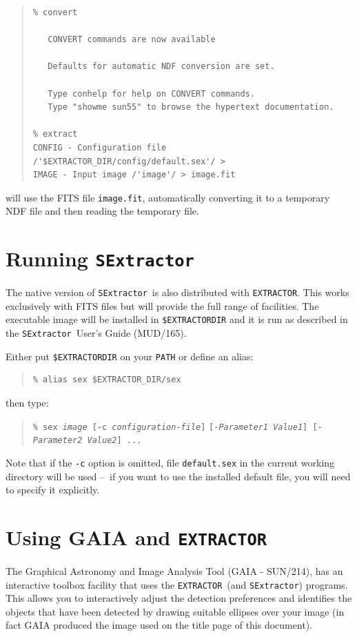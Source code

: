 \documentclass[twoside,11pt]{article}
\newcommand{\htmladdnormallink}[2]{#1}
\newcommand{\latex}[1]{#1}
\newcommand{\xref}[3]{#1}
\newcommand{\xlabel}[1]{}
\renewcommand{\_}{\texttt{\symbol{95}}}
\newcommand{\EXTRACTOR}{\texttt{EXTRACTOR}}
\newcommand{\SExtractor}{\texttt{SExtractor}}
\newcommand{\MUD}{mud165.ps}
\newcommand{\dash}{--}
\newcommand{\dash}{-}
\begin{document}
\begin{quote} \begin{verbatim}
% convert

   CONVERT commands are now available

   Defaults for automatic NDF conversion are set.

   Type conhelp for help on CONVERT commands.
   Type "showme sun55" to browse the hypertext documentation.

% extract
CONFIG - Configuration file /'$EXTRACTOR_DIR/config/default.sex'/ >
IMAGE - Input image /'image'/ > image.fit
\end{verbatim} \end{quote}
will use the FITS file \texttt{image.fit}, automatically converting it to a
temporary NDF file and then reading the temporary file.

\section{\xlabel{running_sextractor}Running \SExtractor \label{running_sextractor}}
The native version of \SExtractor\ is also distributed with \EXTRACTOR.
This works exclusively with FITS files but will provide the full range of
facilities. The executable image will be installed in \texttt{\$EXTRACTOR\_DIR}
and it is run as described in the
\htmladdnormallink{\SExtractor\ User's Guide}{\MUD}\latex{ (MUD/165)}.

Either put \texttt{\$EXTRACTOR\_DIR} on your \texttt{PATH} or define an alias:
\begin{quote} \begin{verbatim}
% alias sex $EXTRACTOR_DIR/sex
\end{verbatim}\end{quote}
then type:
\begin{quote}
\texttt{\% sex \textit{image} [-c \textit{configuration-file}]} 
\texttt{[-\textit{Parameter1 Value1}] [-\textit{Parameter2 Value2}] ...}
\end{quote}

Note that if the \texttt{-c} option is omitted, file \texttt{default.sex} in the
current working directory will be used \dash\ if you want to use the installed
default file, you will need to specify it explicitly.

\section{\xlabel{using_gaia_and_extractor}Using GAIA and \EXTRACTOR}
The Graphical Astronomy and Image Analysis Tool (GAIA -
\xref{SUN/214}{sun214}{}), has an interactive toolbox facility that
uses the \EXTRACTOR\ (and \SExtractor) programs. This allows you to
interactively adjust the detection preferences and identifies the
objects that have been detected by drawing suitable ellipses over your
image (in fact GAIA produced the image used on the title page of this
document).
\end{document}
